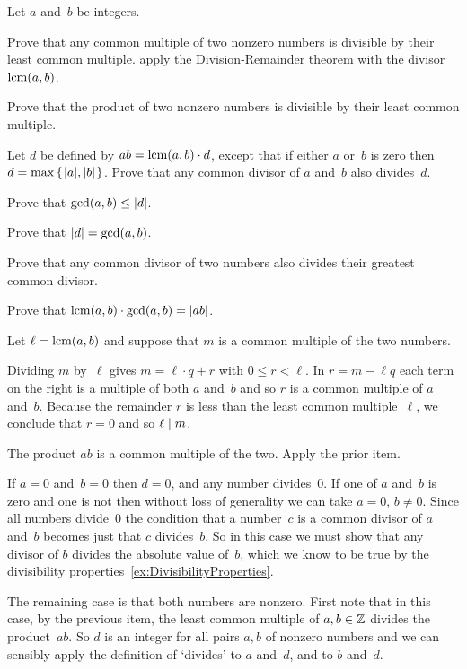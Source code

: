 \documentclass{ibl}
\begin{document}
\begin{ex} Let $a$ and~$b$ be integers.
\begin{exes}
\item Prove that any common multiple of two nonzero
   numbers is divisible by their 
  least common multiple.
  \hint apply the Division-Remainder theorem with the divisor $\operatorname{lcm}(a,b)$.
\item Prove that the product of two nonzero numbers is divisible by their 
  least common multiple.
\item Let $d$ be defined by 
  $ab=\operatorname{lcm}(a,b)\cdot d$, except that if either $a$ or~$b$ is zero
  then $d=\max\mbox{$\{\hspace{0.1em}\lvert a\rvert,\lvert b\rvert\hspace{0.1em}\}$}$.
  Prove that any common divisor of $a$ and~$b$ also divides~$d$.
\item Prove that $\gcd(a,b)\leq\lvert d\rvert$.
\item Prove that $\lvert d\rvert=\gcd(a,b)$. 
\item Prove that any common divisor of two numbers also divides their
  greatest common divisor.
\item Prove that $\operatorname{lcm}(a,b)\cdot\gcd(a,b)=\lvert ab\rvert$. 
\end{exes}  
\begin{ans}  %
\begin{exes}
\item Let $\ell=\operatorname{lcm}(a,b)$ and suppose that $m$ is a common multiple
  of the two numbers.

  Dividing $m$ by~$\ell$ gives 
  $m=\ell\cdot q+r$ with $0\leq r< \ell$.
  In $r=m-\ell q$ 
  each term on the right is a multiple
  of both $a$ and~$b$ and so 
  $r$ is a common multiple of $a$ and~$b$.
  Because the remainder $r$ is less than the least common multiple~$\ell$,
  we conclude that $r=0$ and so $\ell\mid m$.
\item The product $ab$ is a common multiple of the two.
  Apply the prior item.
\item If $a=0$ and~$b=0$ then $d=0$, and any number divides~$0$.
  If one of $a$ and~$b$ is zero and one is not then without loss of generality
  we can take $a=0$, $b\neq 0$.
  Since all numbers divide~$0$ the condition that a number~$c$ 
  is a common divisor of $a$ and~$b$
  becomes just that $c$ divides~$b$.
  So in this case we must show that any divisor of $b$ divides the 
  absolute value of~$b$, which we know to be true by the divisibility 
  properties~\ref{ex:DivisibilityProperties}.

  The remaining case is that both numbers are nonzero.
  First note that in this case,
  by the previous item, the least common multiple of $a,b\in\mathbb{Z}$ divides
  the product~$ab$.
  So $d$ is an integer for all pairs $a,b$ of nonzero numbers
  and we can sensibly apply the definition of `divides' to
  $a$ and~$d$, and to $b$ and~$d$.
  

\end{exes}
\end{ans}
\end{ex}
\end{document}
